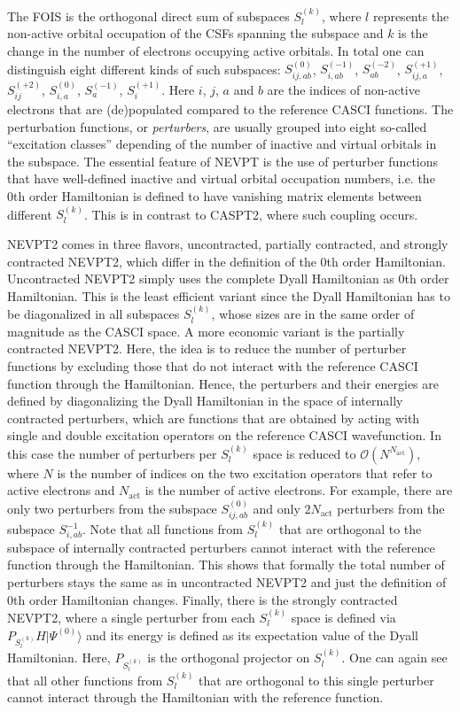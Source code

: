The FOIS is the orthogonal direct sum of subspaces $S_l^{(k)}$,\cite{AngelCELM_2001_10252} where $l$ represents the non-active orbital occupation of the CSFs spanning the subspace and $k$ is the change in the number of electrons occupying active orbitals. In total one can distinguish eight different kinds of such subspaces: $S_{ij,ab}^{(0)}$, $S_{i,ab}^{( - 1)}$, $S_{ab}^{( - 2)}$, $S_{ij,a}^{( + 1)}$, $S_{ij}^{( + 2)}$, $S_{i,a}^{(0)}$, $S_a^{( - 1)}$, $S_i^{( + 1)}$. Here $i$, $j$, $a$ and $b$ are the indices of non-active electrons that are (de)populated compared to the reference CASCI functions. The perturbation functions, or \emph{perturbers}, are usually grouped into eight so-called ``excitation classes'' depending of the number of inactive and virtual orbitals in the subspace. The essential feature of NEVPT is the use of perturber functions that have well-defined inactive and virtual orbital occupation numbers, i.e. the 0th order Hamiltonian is defined to have vanishing matrix elements between different $S_l^{(k)}$. This is in contrast to CASPT2, where such coupling occurs.\cite{AnderMR_1992_1218}

NEVPT2 comes in three flavors, uncontracted, partially contracted, and strongly contracted NEVPT2, which differ in the definition of the 0th order Hamiltonian. Uncontracted NEVPT2 simply uses the complete Dyall Hamiltonian as 0th order Hamiltonian. This is the least efficient variant since the Dyall Hamiltonian has to be diagonalized in all subspaces $S_l^{(k)}$, whose sizes are in the same order of magnitude as the CASCI space. A more economic variant is the partially contracted NEVPT2. Here, the idea is to reduce the number of perturber functions by excluding those that do not interact with the reference CASCI function through the Hamiltonian. Hence, the perturbers and their energies are defined by diagonalizing the Dyall Hamiltonian in the space of internally contracted perturbers, which are functions that are obtained by acting with single and double excitation operators on the reference CASCI wavefunction. In this case the number of perturbers per $S_l^{(k)}$ space is reduced to $\mathcal{O}(N^{N_\text{act}})$, where $N$ is the number of indices on the two excitation operators that refer to active electrons and $N_\text{act}$ is the number of active electrons. For example, there are only two perturbers from the subspace $S_{ij,ab}^{(0)}$ and only $2N_\text{act}$ perturbers from the subspace $S_{i,ab}^{-1}$. Note that all functions from $S_l^{(k)}$ that are orthogonal to the subspace of internally contracted perturbers cannot interact with the reference function through the Hamiltonian. This shows that formally the total number of perturbers stays the same as in uncontracted NEVPT2 and just the definition of 0th order Hamiltonian changes. Finally, there is the strongly contracted NEVPT2, where a single perturber from each $S_l^{(k)}$ space is defined via $P_{S_l^{(k)}} H |\Psi^{(0)}\rangle$ and its energy is defined as its expectation value of the Dyall Hamiltonian. Here, $P_{S_l^{(k)}}$ is the orthogonal projector on $S_l^{(k)}$. One can again see that all other functions from $S_l^{(k)}$ that are orthogonal to this single perturber cannot interact through the Hamiltonian with the reference function.

